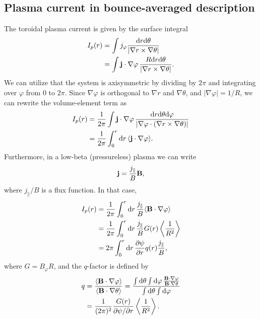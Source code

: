 \documentclass[11pt,a4paper]{article}
\newcommand{\rd}{\ensuremath{\mathrm{d}}}
\renewcommand{\b}[1]{\ensuremath{ {\bf #1 } }}
\begin{document}
\subsection{Plasma current in bounce-averaged description}
The toroidal plasma current is given by the surface integral
\begin{align}
I_p(r) &= \int  j_\varphi \frac{\rd r \rd \theta}{|\nabla r\times\nabla\theta|} \nonumber \\ 
&= \int \b{j}\cdot\nabla \varphi \, \frac{R\rd r \rd \theta}{|\nabla r\times\nabla\theta|} .
\end{align}
We can utilize that the system is axisymmetric by dividing by $2\pi$ and integrating over $\varphi$ from 0 to $2\pi$.
Since $\nabla \varphi$ is orthogonal to $\nabla r$ and $\nabla \theta$, and $|\nabla \varphi| = 1/R$, we can rewrite the volume-element term as
\begin{align}
I_p(r) &= \frac{1}{2\pi} \int \b{j}\cdot\nabla \varphi \, \frac{\rd r \rd \theta \rd\varphi}{|\nabla \varphi \cdot(\nabla r\times\nabla\theta)|}  \nonumber \\
&= \frac{1}{2\pi} \int_0^r \rd r \,\langle \b{j}\cdot\nabla \varphi \rangle.
\end{align}
Furthermore, in a low-beta (pressureless) plasma we can write
\begin{align}
\b{j} = \frac{j_\parallel}{B}\b{B},
\end{align}
where $j_\parallel/B$ is a flux function. In that case,
\begin{align}
I_p(r) &= \frac{1}{2\pi} \int_0^r \rd r \, \frac{j_\parallel}{B} \langle \b{B}\cdot\nabla \varphi \rangle \nonumber \\
&= \frac{1}{2\pi} \int_0^r \rd r\, \frac{j_\parallel}{B} G(r) \left\langle\frac{1}{R^2}\right\rangle \nonumber \\
&= 2\pi  \int_0^r \rd r \,  \frac{\partial \psi}{\partial r}q(r)\frac{j_\parallel}{B} ,
\end{align}
where $G = B_\varphi R$, and the $q$-factor is defined by
\begin{align}
q &= \frac{\langle \b{B}\cdot\nabla \varphi \rangle}{\langle \b{B}\cdot\nabla \theta\rangle} = \frac{\int \rd \theta \int \rd \varphi \, \frac{\b{B}\cdot\nabla\varphi}{\b{B}\cdot\nabla\theta} }{\int \rd \theta \int \rd \varphi} \nonumber \\
&= \frac{1}{(2\pi)^2} \frac{G(r)}{\partial \psi/\partial r} \left\langle\frac{1}{R^2}\right\rangle.
\end{align}
\end{document}
